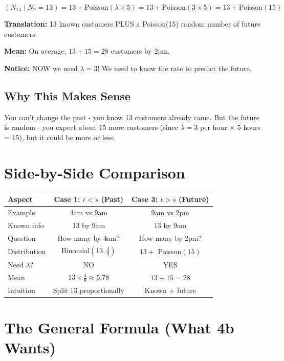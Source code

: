 \documentclass[11pt]{article}
\begin{document}
\begin{tcolorbox}[colback=purple!10!white,colframe=purple!75!black,title=Answer for Case 3]
\[
(N_{14} \mid N_9 = 13) = 13 + \text{Poisson}(\lambda \times 5) = 13 + \text{Poisson}(3 \times 5) = 13 + \text{Poisson}(15)
\]

\textbf{Translation:} 13 known customers PLUS a Poisson(15) random number of future customers.

\textbf{Mean:} On average, $13 + 15 = 28$ customers by 2pm.

\textbf{Notice:} NOW we need $\lambda = 3$! We need to know the rate to predict the future.
\end{tcolorbox}

\subsection{Why This Makes Sense}

You can't change the past - you know 13 customers already came. But the future is random - you expect about 15 more customers (since $\lambda = 3$ per hour $\times$ 5 hours = 15), but it could be more or less.

\section{Side-by-Side Comparison}

\begin{table}[h]
\centering
\begin{tabular}{|l|c|c|}
\hline
\textbf{Aspect} & \textbf{Case 1: $t < s$ (Past)} & \textbf{Case 3: $t > s$ (Future)} \\
\hline
Example & 4am vs 9am & 9am vs 2pm \\
\hline
Known info & 13 by 9am & 13 by 9am \\
\hline
Question & How many by 4am? & How many by 2pm? \\
\hline
Distribution & Binomial$(13, \frac{4}{9})$ & $13 +$ Poisson$(15)$ \\
\hline
Need $\lambda$? & NO & YES \\
\hline
Mean & $13 \times \frac{4}{9} \approx 5.78$ & $13 + 15 = 28$ \\
\hline
Intuition & Split 13 proportionally & Known + future \\
\hline
\end{tabular}
\end{table}

\section{The General Formula (What 4b Wants)}
\end{document}
